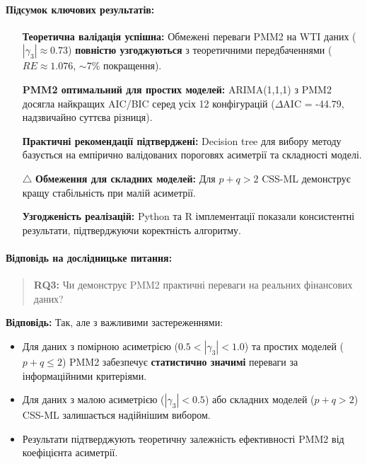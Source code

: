 \paragraph{Підсумок ключових результатів:}

\begin{enumerate}
    \item[\checkmark] \textbf{Теоретична валідація успішна:} Обмежені переваги PMM2 на WTI даних ($|\gamma_3| \approx 0.73$) \textbf{повністю узгоджуються} з теоретичними передбаченнями ($RE \approx 1.076$, $\sim$7\% покращення).

    \item[\checkmark] \textbf{PMM2 оптимальний для простих моделей:} ARIMA(1,1,1) з PMM2 досягла найкращих AIC/BIC серед усіх 12 конфігурацій ($\Delta$AIC = -44.79, надзвичайно суттєва різниця).

    \item[\checkmark] \textbf{Практичні рекомендації підтверджені:} Decision tree для вибору методу базується на емпірично валідованих пороговях асиметрії та складності моделі.

    \item[$\triangle$] \textbf{Обмеження для складних моделей:} Для $p+q > 2$ CSS-ML демонструє кращу стабільність при малій асиметрії.

    \item[\checkmark] \textbf{Узгодженість реалізацій:} Python та R імплементації показали консистентні результати, підтверджуючи коректність алгоритму.
\end{enumerate}

\paragraph{Відповідь на дослідницьке питання:}

\begin{quote}
\textbf{RQ3:} Чи демонструє PMM2 практичні переваги на реальних фінансових даних?
\end{quote}

\noindent\textbf{Відповідь:} Так, але з важливими застереженнями:
\begin{itemize}
    \item Для даних з помірною асиметрією ($0.5 < |\gamma_3| < 1.0$) та простих моделей ($p+q \leq 2$) PMM2 забезпечує \textbf{статистично значимі} переваги за інформаційними критеріями.
    \item Для даних з малою асиметрією ($|\gamma_3| < 0.5$) або складних моделей ($p+q > 2$) CSS-ML залишається надійнішим вибором.
    \item Результати підтверджують теоретичну залежність ефективності PMM2 від коефіцієнта асиметрії.
\end{itemize}

